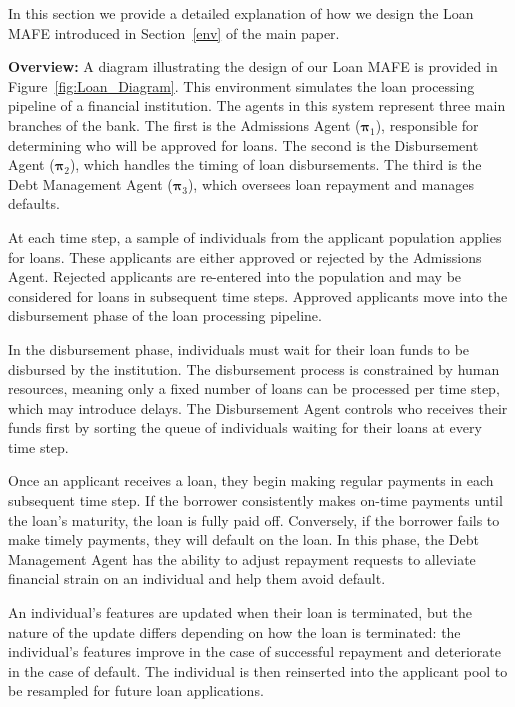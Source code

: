 \label{sec::loan_MAFE}

In this section we provide a detailed explanation of how we design the Loan MAFE introduced in Section~\ref{env} of the main paper.

\textbf{Overview:} 
A diagram illustrating the design of our Loan MAFE is provided in Figure~\ref{fig:Loan_Diagram}. This environment simulates the loan processing pipeline of a financial institution. The agents in this system represent three main branches of the bank. The first is the Admissions Agent ($\boldsymbol{\pi}_{1}$), responsible for determining who will be approved for loans. The second is the Disbursement Agent ($\boldsymbol{\pi}_{2}$), which handles the timing of loan disbursements. The third is the Debt Management Agent ($\boldsymbol{\pi}_{3}$), which oversees loan repayment and manages defaults.

At each time step, a sample of individuals from the applicant population applies for loans. These applicants are either approved or rejected by the Admissions Agent. Rejected applicants are re-entered into the population and may be considered for loans in subsequent time steps. Approved applicants move into the disbursement phase of the loan processing pipeline.

In the disbursement phase, individuals must wait for their loan funds to be disbursed by the institution. The disbursement process is constrained by human resources, meaning only a fixed number of loans can be processed per time step, which may introduce delays. The Disbursement Agent controls who receives their funds first by sorting the queue of individuals waiting for their loans at every time step.

Once an applicant receives a loan, they begin making regular payments in each subsequent time step. If the borrower consistently makes on-time payments until the loan's maturity, the loan is fully paid off. Conversely, if the borrower fails to make timely payments, they will default on the loan. In this phase, the Debt Management Agent has the ability to adjust repayment requests to alleviate financial strain on an individual and help them avoid default.

An individual’s features are updated when their loan is terminated, but the nature of the update differs depending on how the loan is terminated: the individual’s features improve in the case of successful repayment and deteriorate in the case of default. The individual is then reinserted into the applicant pool to be resampled for future loan applications.

